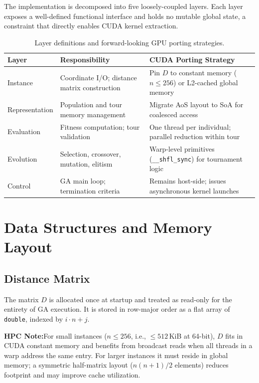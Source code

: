 \documentclass[11pt, letterpaper]{article}
\newcommand{\hpcnote}[1]{%
  \vspace{0.4em}
  \noindent\colorbox{blue!6}{\parbox{\dimexpr\linewidth-2\fboxsep}{%
    \footnotesize\textbf{HPC Note:}\enspace #1
  }}
  \vspace{0.4em}
}
\begin{document}
The implementation is decomposed into five loosely-coupled layers.  Each layer
exposes a well-defined functional interface and holds no mutable global state,
a constraint that directly enables CUDA kernel extraction.

\begin{table}[h]
\centering
\caption{Layer definitions and forward-looking GPU porting strategies.}
\label{tab:layers}
\renewcommand{\arraystretch}{1.35}
\begin{tabular}{@{} p{2.4cm} p{4.2cm} p{5.8cm} @{}}
\toprule
\textbf{Layer} & \textbf{Responsibility} & \textbf{CUDA Porting Strategy} \\
\midrule
Instance        & Coordinate I/O; distance matrix construction
                & Pin $D$ to constant memory ($n \leq 256$) or L2-cached global memory \\
Representation  & Population and tour memory management
                & Migrate AoS layout to SoA for coalesced access \\
Evaluation      & Fitness computation; tour validation
                & One thread per individual; parallel reduction within tour \\
Evolution       & Selection, crossover, mutation, elitism
                & Warp-level primitives (\texttt{\_\_shfl\_sync}) for tournament logic \\
Control         & GA main loop; termination criteria
                & Remains host-side; issues asynchronous kernel launches \\
\bottomrule
\end{tabular}
\end{table}

\section{Data Structures and Memory Layout}

\subsection{Distance Matrix}

The matrix $D$ is allocated once at startup and treated as read-only for the
entirety of GA execution.  It is stored in row-major order as a flat array of
\texttt{double}, indexed by $i \cdot n + j$.

\hpcnote{For small instances ($n \leq 256$, i.e., $\leq 512$\,KiB at 64-bit),
$D$ fits in CUDA constant memory and benefits from broadcast reads when all
threads in a warp address the same entry.  For larger instances it must reside
in global memory; a symmetric half-matrix layout ($n(n+1)/2$ elements) reduces
footprint and may improve cache utilization.}
\end{document}
